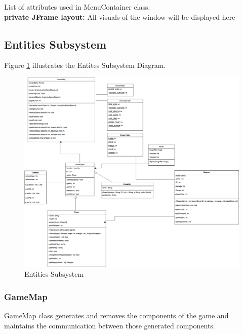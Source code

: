 \documentclass[12pt]{article} %
\begin{document}
List of attributes used in MenuContainer class.\\
\textbf{private JFrame layout:} All visuals of the window will be displayed here\\




\subsection{Entities Subsystem}

Figure \ref{fig:entity} illustrates the Entites Subsystem Diagram.

\begin{figure}[h!]
   \centering
   \vspace{10pt}%
   \includegraphics[width=17cm]{entity.png}
   \caption{Entities Subsystem}
   \label{fig:entity}
\end{figure}

\subsubsection{GameMap} %
GameMap class generates and removes the components of the game and maintains the communication between those generated components. 
\end{document}
